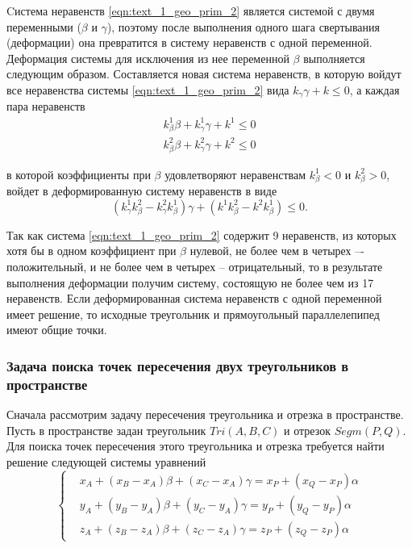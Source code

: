 Cистема неравенств \eqref{eqn:text_1_geo_prim_2} является системой с двумя переменными ($\beta$ и $\gamma$), поэтому после выполнения одного шага свертывания (деформации) она превратится в систему неравенств с одной переменной.
Деформация системы для исключения из нее переменной $\beta$ выполняется следующим образом.
Составляется новая система неравенств, в которую войдут все неравенства системы \eqref{eqn:text_1_geo_prim_2} вида $k_{\gamma} \gamma + k \le 0$, а каждая пара неравенств
\begin{equation}
	\begin{aligned}
		k_{\beta}^1 \beta + k_{\gamma}^1 \gamma + k^1 \le 0 \\
		k_{\beta}^2 \beta + k_{\gamma}^2 \gamma + k^2 \le 0
	\end{aligned}
\end{equation}

в которой коэффициенты при $\beta$ удовлетворяют неравенствам $k_{\beta}^1 < 0$ и $k_{\beta}^2 > 0$, войдет в деформированную систему неравенств в виде
\begin{equation}
	(k_{\gamma}^1 k_{\beta}^2 - k_{\gamma}^2 k_{\beta}^1) \gamma + (k^1 k_{\beta}^2 - k^2 k_{\beta}^1) \le 0. 
\end{equation}

Так как система \eqref{eqn:text_1_geo_prim_2} содержит 9 неравенств, из которых хотя бы в одном коэффициент при $\beta$ нулевой, не более чем в четырех –- положительный, и не более чем в четырех -- отрицательный, то в результате выполнения деформации получим систему, состоящую не более чем из 17 неравенств.
Если деформированная система неравенств с одной переменной имеет решение, то исходные треугольник и прямоугольный параллелепипед имеют общие точки.

\subsubsection{Задача поиска точек пересечения двух треугольников в пространстве}\label{sec:text_1_geo_prim_tri_tri}

Сначала рассмотрим задачу пересечения треугольника и отрезка в пространстве.
Пусть в пространстве задан треугольник $Tri(A, B, C)$ и отрезок $Segm(P, Q)$.
Для поиска точек пересечения этого треугольника и отрезка требуется найти решение следующей системы уравнений
\begin{equation}\label{eqn:text_1_geo_prim_tri_segm_int}
	\left\{
		\begin{aligned}
			& x_A + (x_B - x_A) \beta + (x_C - x_A) \gamma = x_P + (x_Q - x_P) \alpha \\
			& y_A + (y_B - y_A) \beta + (y_C - y_A) \gamma = y_P + (y_Q - y_P) \alpha \\
			& z_A + (z_B - z_A) \beta + (z_C - z_A) \gamma = z_P + (z_Q - z_P) \alpha
		\end{aligned}
	\right.
\end{equation}

